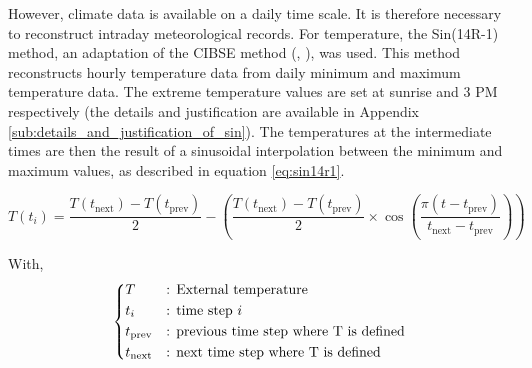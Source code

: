 \documentclass[11pt]{article}
\begin{document}
        \begin{table}[ht]
            \caption{\label{tab:climate_models} The Explore2 simulations used in this study.}
        \end{table}

        However, climate data is available on a daily time scale. It is therefore necessary to reconstruct intraday meteorological records. For temperature, the Sin(14R-1) method, an adaptation of the CIBSE method (\cite{petherbridge_weather_1983}, \cite{chow_new_2007}), was used. This method reconstructs hourly temperature data from daily minimum and maximum temperature data. The extreme temperature values are set at sunrise and 3 PM respectively (the details and justification are available in Appendix \ref{sub:details_and_justification_of_sin}). The temperatures at the intermediate times are then the result of a sinusoidal interpolation between the minimum and maximum values, as described in equation \eqref{eq:sin14r1}.

        \begin{equation}\label{eq:sin14r1}
             T(t_i) = \frac{T(t_\mathrm{next})-T(t_\mathrm{prev})}{2} - \left(\frac{T(t_\mathrm{next})-T(t_\mathrm{prev})}{2} \times \cos\left(\frac{\pi\left(t-t_\mathrm{prev}\right)}{t_\mathrm{next}-t_\mathrm{prev}}\right)\right)
        \end{equation} 

        \noindent
        With,
        $$
        \begin{dcases}
            T&\text{: External temperature}\\
            t_i&\text{: time step $i$}\\
            t_\mathrm{prev}&\text{: previous time step where T is defined}\\
            t_\mathrm{next}&\text{: next time step where T is defined}\\
        \end{dcases}
        $$
\end{document}
